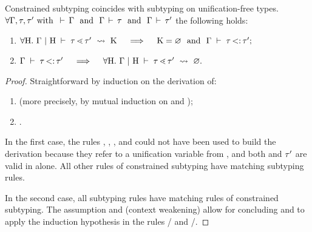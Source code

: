 \begin{lemma}{Constrained subtyping coincides with subtyping on
    unification-free types.}%
\label{lem:subtyctr-subty}
    $\forall \AEnv, \ty, \ty' \text{ with } 
    \tyvld{}{\AEnv} \ \text{ and }\ \tyvlddflt{\ty} \ \text{ and }\ \tyvlddflt{\ty'}$ 
    the following holds:
    \begin{enumerate}
        \item $\forall \UEnvD.\ \subtyctrdflt{\ty}{\ty'} \quad\implies\quad
            \CSet = \EmptyCSet\ \text{ and }\ \subtydflt{\ty}{\ty'};$
        \item $\subtydflt{\ty}{\ty'} \quad\implies\quad 
            \forall \UEnvD.\ \subtyctrdfltenv{\ty}{\ty'}{\EmptyCSet}.$
    \end{enumerate}
\end{lemma}
\begin{proof}
    Straightforward by induction on the derivation of:
    \begin{enumerate}
        \item {} (more precisely, by mutual induction
            on  and );
        \item {}.
    \end{enumerate}

    In the first case, the rules , , ,
    and  could not have been used to build the derivation
    because they refer to a unification variable \va from \UEnvD,
    and both \ty and $\tau'$ are valid in \AEnv alone.
    All other rules of constrained subtyping have matching subtyping rules.

    In the second case, all subtyping rules have matching rules of constrained
    subtyping.
    The assumption \tyvld{}{\AEnv} and  (context
    weakening) allow for concluding 
    \tyvlddflt{\plug\dctx\tyub} and \tyvlddflt{\tylb} 
    to apply the induction hypothesis in the rules
    / and /.
\end{proof}

